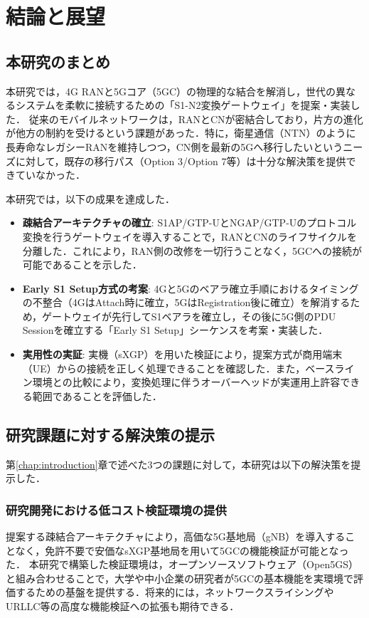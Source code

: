 \chapter{結論と展望}
\label{chap:conclusion}

\section{本研究のまとめ}
本研究では，4G RANと5Gコア（5GC）の物理的な結合を解消し，世代の異なるシステムを柔軟に接続するための「S1-N2変換ゲートウェイ」を提案・実装した．
従来のモバイルネットワークは，RANとCNが密結合しており，片方の進化が他方の制約を受けるという課題があった．特に，衛星通信（NTN）のように長寿命なレガシーRANを維持しつつ，CN側を最新の5Gへ移行したいというニーズに対して，既存の移行パス（Option 3/Option 7等）は十分な解決策を提供できていなかった．

本研究では，以下の成果を達成した．

\begin{itemize}
	\item \textbf{疎結合アーキテクチャの確立}:
	S1AP/GTP-UとNGAP/GTP-Uのプロトコル変換を行うゲートウェイを導入することで，RANとCNのライフサイクルを分離した．これにより，RAN側の改修を一切行うことなく，5GCへの接続が可能であることを示した．

	\item \textbf{Early S1 Setup方式の考案}:
	4Gと5Gのベアラ確立手順におけるタイミングの不整合（4GはAttach時に確立，5GはRegistration後に確立）を解消するため，ゲートウェイが先行してS1ベアラを確立し，その後に5G側のPDU Sessionを確立する「Early S1 Setup」シーケンスを考案・実装した．

	\item \textbf{実用性の実証}:
	実機（sXGP）を用いた検証により，提案方式が商用端末（UE）からの接続を正しく処理できることを確認した．また，ベースライン環境との比較により，変換処理に伴うオーバーヘッドが実運用上許容できる範囲であることを評価した．
\end{itemize}

\section{研究課題に対する解決策の提示}
第\ref{chap:introduction}章で述べた3つの課題に対して，本研究は以下の解決策を提示した．

\subsection{研究開発における低コスト検証環境の提供}
提案する疎結合アーキテクチャにより，高価な5G基地局（gNB）を導入することなく，免許不要で安価なsXGP基地局を用いて5GCの機能検証が可能となった．
本研究で構築した検証環境は，オープンソースソフトウェア（Open5GS）と組み合わせることで，大学や中小企業の研究者が5GCの基本機能を実環境で評価するための基盤を提供する．将来的には，ネットワークスライシングやURLLC等の高度な機能検証への拡張も期待できる．


